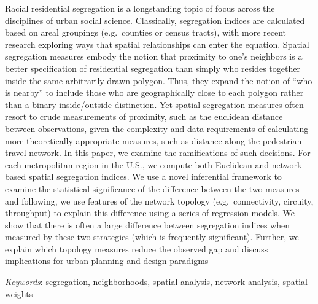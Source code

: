\documentclass[
  10pt,
]{article}
\renewenvironment{abstract}
 {{%
    \setlength{\leftmargin}{0mm}
    \setlength{\rightmargin}{\leftmargin}%
  }%
  \relax}
 {\endlist}
\begin{document}
\begin{abstract}


    \vskip 8.5pt %

\noindent \small{Racial residential segregation is a longstanding topic
of focus across the disciplines of urban social science. Classically,
segregation indices are calculated based on areal groupings
(e.g.~counties or census tracts), with more recent research exploring
ways that spatial relationships can enter the equation. Spatial
segregation measures embody the notion that proximity to one's neighbors
is a better specification of residential segregation than simply who
resides together inside the same arbitrarily-drawn polygon. Thus, they
expand the notion of ``who is nearby'' to include those who are
geographically close to each polygon rather than a binary inside/outside
distinction. Yet spatial segregation measures often resort to crude
measurements of proximity, such as the euclidean distance between
observations, given the complexity and data requirements of calculating
more theoretically-appropriate measures, such as distance along the
pedestrian travel network. In this paper, we examine the ramifications
of such decisions. For each metropolitan region in the U.S., we compute
both Euclidean and network-based spatial segregation indices. We use a
novel inferential framework to examine the statistical significance of
the difference between the two measures and following, we use features
of the network topology (e.g.~connectivity, circuity, throughput) to
explain this difference using a series of regression models. We show
that there is often a large difference between segregation indices when
measured by these two strategies (which is frequently significant).
Further, we explain which topology measures reduce the observed gap and
discuss implications for urban planning and design paradigms}


\vskip 8.5pt \noindent \emph{Keywords}: segregation, neighborhoods,
spatial analysis, network analysis, spatial weights \par




\end{abstract}


\vskip -8.5pt



\end{document}

